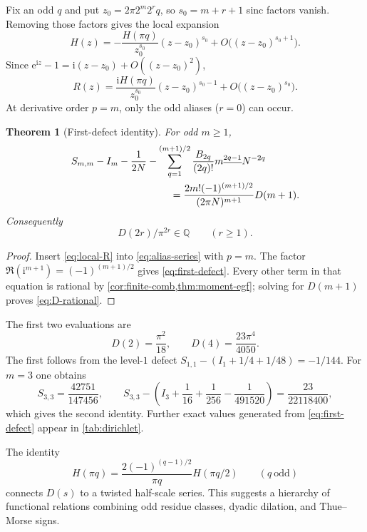 \documentclass[11pt]{article}
\newtheorem{theorem}{Theorem}[section]
\theoremstyle{definition}
\theoremstyle{remark}
\newcommand{\e}{\mathrm e}
\newcommand{\ii}{\mathrm i}
\newcommand{\fall}[2]{#1^{\underline{#2}}}
\begin{document}
Fix an odd $q$ and put $z_0=2\pi2^m2^rq$, so
$s_0=m+r+1$ sinc factors vanish.  Removing those factors gives the local
expansion
\begin{equation}\label{eq:local-H}
 H(z)=-\frac{H(\pi q)}{z_0^{s_0}}(z-z_0)^{s_0}
       +O\bigl((z-z_0)^{s_0+1}\bigr).
\end{equation}
Since $\e^{\ii z}-1=\ii(z-z_0)+O((z-z_0)^2)$,
\begin{equation}\label{eq:local-R}
 R(z)=\frac{\ii H(\pi q)}{z_0^{s_0}}
       (z-z_0)^{s_0-1}+O\bigl((z-z_0)^{s_0}\bigr).
\end{equation}
At derivative order $p=m$, only the odd aliases ($r=0$) can occur.

\begin{theorem}[First-defect identity]\label{thm:first-defect}
For odd $m\ge1$,
\begin{align}
 &S_{m,m}-I_m-\frac1{2N}
 -\sum_{q=1}^{(m+1)/2}
   \frac{B_{2q}}{(2q)!}\fall m{2q-1}N^{-2q}
 \notag\\
 &\hspace{35mm}=
 \frac{2m!(-1)^{(m+1)/2}}{(2\pi N)^{m+1}}D(m+1).
 \label{eq:first-defect}
\end{align}
Consequently
\begin{equation}\label{eq:D-rational}
 \boxed{\quad D(2r)/\pi^{2r}\in\mathbb Q\qquad(r\ge1).\quad}
\end{equation}
\end{theorem}

\begin{proof}
Insert \eqref{eq:local-R} into \eqref{eq:alias-series} with $p=m$.
The factor $\Re(\ii^{m+1})=(-1)^{(m+1)/2}$ gives
\eqref{eq:first-defect}.  Every other term in that equation is rational by
\cref{cor:finite-comb,thm:moment-egf}; solving for $D(m+1)$ proves
\eqref{eq:D-rational}.
\end{proof}

The first two evaluations are
\begin{equation}\label{eq:D2D4}
 D(2)=\frac{\pi^2}{18},
 \qquad
 D(4)=\frac{23\pi^4}{4050}.
\end{equation}
The first follows from the level-$1$ defect
$S_{1,1}-(I_1+1/4+1/48)=-1/144$.  For $m=3$ one obtains
\[
 S_{3,3}=\frac{42751}{147456},
 \qquad
 S_{3,3}-\left(I_3+\frac1{16}+\frac1{256}-\frac1{491520}\right)
 =\frac{23}{22118400},
\]
which gives the second identity.  Further exact values generated from
\eqref{eq:first-defect} appear in \cref{tab:dirichlet}.

The identity
\[
 H(\pi q)=\frac{2(-1)^{(q-1)/2}}{\pi q}H(\pi q/2)
 \qquad(q\ \text{odd})
\]
connects $D(s)$ to a twisted half-scale series.  This suggests a hierarchy of
functional relations combining odd residue classes, dyadic dilation, and
Thue--Morse signs.
\end{document}
